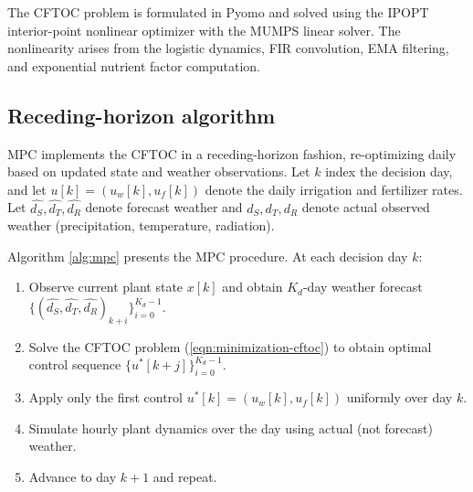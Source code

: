 \documentclass[preprint,12pt]{elsarticle}
\begin{document}
The CFTOC problem is formulated in Pyomo \cite{bynum2021pyomo} and solved using the IPOPT interior-point nonlinear optimizer \cite{wachter2006ipopt} with the MUMPS linear solver. The nonlinearity arises from the logistic dynamics, FIR convolution, EMA filtering, and exponential nutrient factor computation.

\subsection{Receding-horizon algorithm}\label{subsec:mpc-algorithm}

MPC implements the CFTOC in a receding-horizon fashion, re-optimizing daily based on updated state and weather observations. Let $k$ index the decision day, and let $u[k] = (u_{w}[k], u_{f}[k])$ denote the daily irrigation and fertilizer rates. Let $\hat{d_{S}}, \hat{d_{T}}, \hat{d_{R}}$ denote forecast weather and $d_S, d_T, d_R$ denote actual observed weather (precipitation, temperature, radiation).

Algorithm \ref{alg:mpc} presents the MPC procedure. At each decision day $k$:
\begin{enumerate}
\item Observe current plant state $x[k]$ and obtain $K_{d}$-day weather forecast $\{(\hat{d_{S}}, \hat{d_{T}}, \hat{d_{R}})_{k+i}\}_{i=0}^{K_{d}-1}$.
\item Solve the CFTOC problem (\ref{eqn:minimization-cftoc}) to obtain optimal control sequence $\{u^*[k+j]\}_{i=0}^{K_{d}-1}$.
\item Apply only the first control $u^*[k] = (u_{w}[k], u_{f}[k])$ uniformly over day $k$.
\item Simulate hourly plant dynamics over the day using actual (not forecast) weather.
\item Advance to day $k+1$ and repeat.
\end{enumerate}
\end{document}
